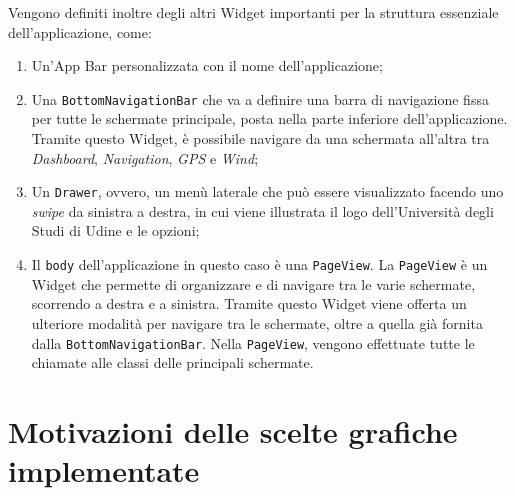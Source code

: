 Vengono definiti inoltre degli altri Widget importanti per la struttura essenziale dell'applicazione, come:
\begin{enumerate}
	\item Un'App Bar personalizzata con il nome dell'applicazione;
	\item Una \verb|BottomNavigationBar| che va a definire una barra di navigazione fissa per tutte le schermate principale, posta nella parte inferiore dell'applicazione. Tramite questo Widget, è possibile navigare da una schermata all'altra tra \textit{Dashboard}, \textit{Navigation}, \textit{GPS} e \textit{Wind};
	\item Un \verb|Drawer|, ovvero, un menù laterale che può essere visualizzato facendo uno \textit{swipe} da sinistra a destra, in cui viene illustrata il logo dell'Università degli Studi di Udine e le opzioni;
	\item Il \verb|body| dell'applicazione in questo caso è una \verb|PageView|. La \verb|PageView| è un Widget che permette di organizzare e di navigare tra le varie schermate, scorrendo a destra e a sinistra. Tramite questo Widget viene offerta un ulteriore modalità per navigare tra le schermate, oltre a quella già fornita dalla \verb|BottomNavigationBar|. Nella \verb|PageView|, vengono effettuate tutte le chiamate alle classi delle principali schermate.
\end{enumerate}

\section{Motivazioni delle scelte grafiche implementate}

